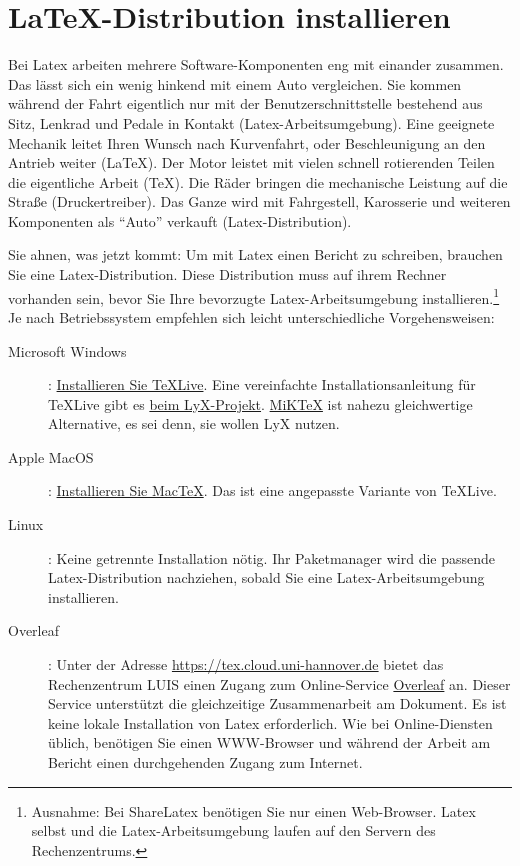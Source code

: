 \documentclass[ngerman]{scrartcl}
\begin{document}
\section{\LaTeX-Distribution installieren}
Bei Latex arbeiten mehrere Software-Komponenten eng mit einander zusammen. Das lässt sich ein wenig hinkend mit einem Auto vergleichen. Sie kommen während der Fahrt eigentlich nur mit der Benutzerschnittstelle bestehend aus Sitz, Lenkrad und Pedale in Kontakt (Latex-Arbeitsumgebung). Eine geeignete Mechanik leitet Ihren Wunsch nach Kurvenfahrt, oder Beschleunigung an den Antrieb weiter (\LaTeX). Der Motor leistet mit vielen schnell rotierenden Teilen die eigentliche Arbeit (\TeX). Die Räder bringen die mechanische Leistung auf die Straße (Druckertreiber). Das Ganze wird mit Fahrgestell, Karosserie und weiteren Komponenten als ``Auto'' verkauft (Latex-Distribution).

Sie ahnen, was jetzt kommt: Um mit Latex einen Bericht zu schreiben, brauchen Sie eine Latex-Distribution. Diese Distribution muss auf ihrem Rechner vorhanden sein, bevor Sie Ihre bevorzugte Latex-Arbeitsumgebung installieren.\footnote{\label{distro-ausnahme}Ausnahme: Bei ShareLatex benötigen Sie nur einen Web-Browser. Latex selbst und die Latex-Arbeitsumgebung laufen auf den Servern des Rechenzentrums.} Je nach Betriebssystem empfehlen sich leicht unterschiedliche Vorgehensweisen:
\begin{description}
	\item [Microsoft Windows]: {\href{https://www.tug.org/texlive/windows.html}{Installieren Sie TeXLive}}. Eine vereinfachte Installationsanleitung für TeXLive gibt es {\href{https://wiki.lyx.org/Windows/TeXLive}{beim LyX-Projekt}}. {\href{https://miktex.org/howto/install-miktex}{MiKTeX}} ist nahezu gleichwertige Alternative, es sei denn, sie wollen LyX nutzen.
	\item [Apple MacOS]: {\href{https://tug.org/mactex/mactex-download.html}{Installieren Sie MacTeX}}. Das ist eine angepasste Variante von TeXLive.
	\item [Linux]: Keine getrennte Installation nötig. Ihr Paketmanager wird die passende Latex-Dis\-tribu\-tion nachziehen, sobald Sie eine Latex-Arbeitsumgebung installieren.
	\item [Overleaf]: Unter der Adresse \url{https://tex.cloud.uni-hannover.de} bietet das Rechenzentrum LUIS einen Zugang zum Online-Service \href{https://www.overleaf.com/}{Overleaf} an. Dieser Service unterstützt die gleichzeitige Zusammenarbeit am Dokument. Es ist keine lokale Installation von Latex erforderlich. Wie bei Online-Diensten üblich, benötigen Sie einen WWW-Browser und während der Arbeit am Bericht einen durchgehenden Zugang zum Internet.

\end{description}
\end{document}
